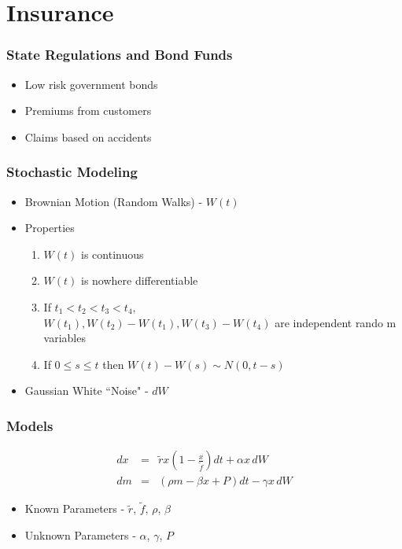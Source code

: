 \documentclass{beamer}   %
\newcommand{\lp}{\left(}
\newcommand{\rp}{\right)}
\begin{document}
\section{Insurance}

\begin{frame}
  \frametitle{State Regulations and Bond Funds}
  \begin{itemize}
  \item Low risk government bonds
  \item Premiums from customers
  \item Claims based on accidents
  \end{itemize}
\end{frame}


\begin{frame}
  \frametitle{Stochastic Modeling}
  \begin{itemize}
  \item Brownian Motion (Random Walks) - $W(t)$
  \item Properties
    \begin{enumerate}[i]
    \item $W(t)$ is continuous
    \item $W(t)$ is nowhere differentiable
    \item If $t_{1}<t_{2}<t_{3}<t_{4}$, \\
      $W(t_{1}), W(t_{2})-W(t_{1}),  W(t_{3})-W(t_{4})$ are independent rando
      m variables
    \item If $0 \le s\le t$ then $W(t)-W(s) \sim N(0, t-s)$
    \end{enumerate}
  \item Gaussian White ``Noise" - $dW$
  \end{itemize}
\end{frame}


\begin{frame}
  \frametitle{Models}
  \begin{eqnarray*}
    dx &=& \tilde{r} x \lp 1- \frac{x}{\tilde{f}}\rp dt +\alpha x \, dW \\
    dm &=& ( \rho m - \beta x + P) dt - \gamma x \, dW
  \end{eqnarray*}
  \begin{itemize}
  \item Known Parameters - $\tilde{r}$, $\tilde{f}$, $\rho$, $\beta$
  \item Unknown Parameters - $\alpha$, $\gamma$, $P$
  \end{itemize}
\end{frame}
\end{document}
